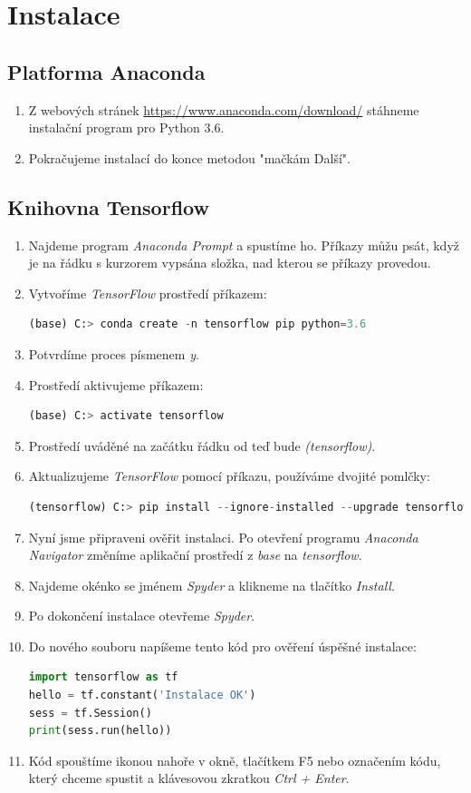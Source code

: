 \documentclass[12pt,a4paper]{report}
\begin{document}
\chapter{Instalace}
	\section{Platforma Anaconda}
	\begin{enumerate}
		\item Z webových stránek \url{https://www.anaconda.com/download/} stáhneme instalační program pro Python 3.6.
		\item Pokračujeme instalací do konce metodou "mačkám Další".
	\end{enumerate}
		\section{Knihovna Tensorflow}
		\begin{enumerate}
		\item Najdeme program \textit{Anaconda Prompt} a spustíme ho. Příkazy můžu psát, když je na řádku s kurzorem vypsána složka, nad kterou se příkazy provedou.
		\item Vytvoříme \textit{TensorFlow} prostředí příkazem:
		\begin{lstlisting}[language=Python]
(base) C:> conda create -n tensorflow pip python=3.6
		\end{lstlisting}
		\item Potvrdíme proces písmenem \textit{y}.
		\item Prostředí aktivujeme příkazem:
		\begin{lstlisting}[language=Python]
(base) C:> activate tensorflow
		\end{lstlisting}
		\item Prostředí uváděné na začátku řádku od teď bude \textit{(tensorflow)}.
		\item Aktualizujeme \textit{TensorFlow} pomocí příkazu, používáme dvojité pomlčky:
		\begin{lstlisting}[language=Python]
(tensorflow) C:> pip install --ignore-installed --upgrade tensorflow 
		\end{lstlisting}
		\item Nyní jsme připraveni ověřit instalaci. Po otevření programu \textit{Anaconda Navigator} změníme aplikační prostředí z \textit{base} na \textit{tensorflow}.
		\item Najdeme okénko se jménem \textit{Spyder} a klikneme na tlačítko \textit{Install}.
		\item Po dokončení instalace otevřeme \textit{Spyder}.
		\item Do nového souboru napíšeme tento kód pro ověření úspěšné instalace:
		\begin{lstlisting}[language=Python]
import tensorflow as tf
hello = tf.constant('Instalace OK')
sess = tf.Session()
print(sess.run(hello))
		\end{lstlisting}
		\item Kód spouštíme ikonou nahoře v okně, tlačítkem F5 nebo označením kódu, který chceme spustit a klávesovou zkratkou \textit{Ctrl + Enter}.
	\end{enumerate}
\end{document}
